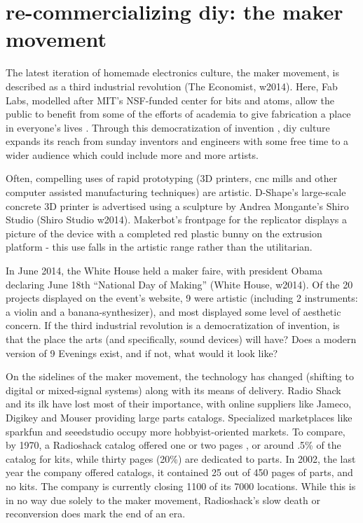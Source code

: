 \section{re-commercializing diy: the maker movement}  

The latest iteration of homemade electronics culture, the maker movement, is described as a third industrial revolution (The Economist, w2014). Here, Fab Labs, modelled after MIT’s NSF-funded center for bits and atoms, allow the public to benefit from some of the efforts of academia to give fabrication a place in everyone’s lives \cite{padfield2014,blikstein2013}. Through this democratization of invention \cite{blikstein2013}, diy culture expands its reach from sunday inventors and engineers with some free time to a wider audience which could include more and more artists. 

	Often, compelling uses of rapid prototyping (3D printers, cnc mills and other computer assisted manufacturing techniques) are artistic. D-Shape’s large-scale concrete 3D printer is advertised using a sculpture by Andrea Mongante’s Shiro Studio (Shiro Studio w2014). Makerbot’s frontpage for the replicator displays a picture of the device with a completed red plastic bunny on the extrusion platform - this use falls in the artistic range rather than the utilitarian. 

In June 2014, the White House held a maker faire, with president Obama declaring June 18th “National Day of Making” (White House, w2014). Of the 20 projects displayed on the event’s website, 9 were artistic (including 2 instruments: a violin and a banana-synthesizer), and most displayed some level of aesthetic concern. If the third industrial revolution is a democratization of invention, is that the place the arts (and specifically, sound devices) will have? Does a modern version of 9 Evenings exist, and if not, what would it look like? 

On the sidelines of the maker movement, the technology has changed (shifting to digital or mixed-signal systems) along with its means of delivery. Radio Shack and its ilk have lost most of their importance, with online suppliers like Jameco, Digikey and Mouser providing large parts catalogs. Specialized marketplaces like sparkfun and seeedstudio occupy more hobbyist-oriented markets. To compare, by 1970, a Radioshack catalog offered one or two pages , or around .5\% of the catalog for kits, while thirty pages (20\%) are dedicated to parts. In 2002, the last year the company offered catalogs, it contained 25 out of 450 pages of parts, and no kits. The company is currently closing 1100 of its 7000 locations. While this is in no way due solely to the maker movement, Radioshack’s slow death or reconversion does mark the end of an era. 

